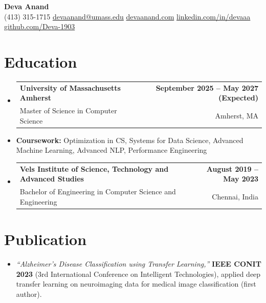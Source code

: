 \documentclass[letterpaper,10pt]{article}
\makeatletter
\newcommand{\resumeSubheading}[4]{
  \vspace{1pt}\item
    \begin{tabular*}{0.985\textwidth}[t]{l@{\extracolsep{\fill}}r}
      \textbf{#1} & \textbf{\small #2} \\
      {\small\color{ResumeSlate} #3} & {\small\color{ResumeSlate} #4} \\
    \end{tabular*}\vspace{-6pt}
}
\newcommand{\resumeSubItem}[1]{\item[]\small{#1\vspace{-1pt}}}
\newcommand{\resumeSubHeadingListStart}{\begin{itemize}[leftmargin=0.0in, label={}, itemsep=2pt, topsep=2pt]}
\newcommand{\resumeSubHeadingListEnd}{\end{itemize}}
\makeatother
\begin{document}
\begin{center}
    {\LARGE \bfseries \textcolor{ResumeNavy}{Deva Anand}} \\ \vspace{4pt}
    \small
    (413) 315-1715 \enspace\textbar\enspace
    \href{mailto:devaanand@umass.edu}{devaanand@umass.edu} \enspace\textbar\enspace
    \href{https://devaanand.com}{devaanand.com} \enspace\textbar\enspace
    \href{https://linkedin.com/in/devaaa/}{linkedin.com/in/devaaa} \enspace\textbar\enspace
    \href{https://github.com/Deva-1903}{github.com/Deva-1903}
    \vspace{-6pt}
\end{center}
\section{Education}
\resumeSubHeadingListStart
  \resumeSubheading
    {University of Massachusetts Amherst}{September 2025 -- May 2027 (Expected)}
    {Master of Science in Computer Science}{Amherst, MA}
  \resumeSubItem{\textbf{Coursework:} Optimization in CS, Systems for Data Science, Advanced Machine Learning, Advanced NLP, Performance Engineering}
  \resumeSubheading
    {Vels Institute of Science, Technology and Advanced Studies}{August 2019 -- May 2023}
    {Bachelor of Engineering in Computer Science and Engineering}{Chennai, India}
\resumeSubHeadingListEnd
\vspace{-4pt}
\section{Publication}
\begin{itemize}[leftmargin=0.18in, itemsep=0pt, topsep=1pt]
  \item\small \textit{``Alzheimer's Disease Classification using Transfer Learning,''} \textbf{IEEE CONIT 2023} (3rd International Conference on Intelligent Technologies), applied deep transfer learning on neuroimaging data for medical image classification (first author).
\end{itemize}
\vspace{-4pt}
\end{document}
